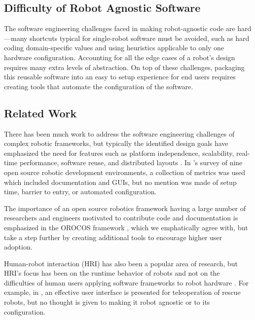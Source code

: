\documentclass[10pt,journal,compsoc]{joser1}
\begin{document}
{%
\subsection{Difficulty of Robot Agnostic Software}

The software engineering challenges faced in making robot-agnostic code are
hard---many shortcuts typical for single-robot software must be avoided, such as
hard coding domain-specific values and using heuristics applicable to only one
hardware configuration. Accounting for all the edge cases of a robot's design
requires many extra levels of abstraction. On top of these challenges, packaging
this reusable software into an easy to setup experience for end users
requires creating tools that automate the configuration of the software.

\subsection{Related Work}

There has been much work to address the software engineering challenges of
complex robotic frameworks, but typically the identified design goals have
emphasized the need for features such as platform independence, scalability,
real-time performance, software reuse, and distributed layouts
\cite{realtime_framework, collett2005player, kramer2007development}. In
\cite{kramer2007development}'s survey of nine open source robotic development
environments, a collection of metrics was used which included documentation and
GUIs, but no mention was made of setup time, barrier to entry, or automated
configuration.

The importance of an open source robotics framework having a large number of
researchers and engineers motivated to contribute code and documentation is
emphasized in the OROCOS framework \cite{bruyninckx2001open}, which we
emphatically agree with, but take a step further by creating additional tools to
encourage higher user adoption.
  
Human-robot interaction (HRI) has also been a popular area of research, but
HRI's focus has been on the runtime behavior of robots and not on the
difficulties of human users applying software frameworks to robot hardware
\cite{hci_metrics, yancotaxonomy, goodrichseven}. For example, in
\cite{rescueRobots}, an effective user interface is presented for teleoperation
of rescue robots, but no thought is given to making it robot agnostic or to its
configuration. 

}
\end{document}
